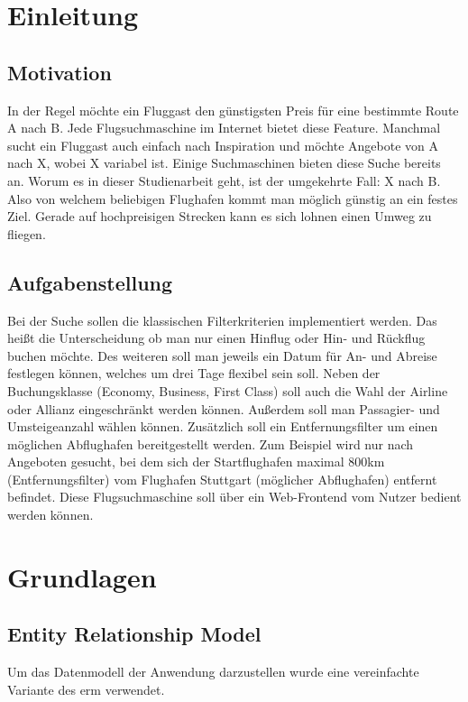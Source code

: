\documentclass[12pt,twoside,a4paper]{article}
\begin{document}
\section{Einleitung}
\subsection{Motivation}
In der Regel möchte ein Fluggast den günstigsten Preis für eine bestimmte Route A nach B. Jede Flugsuchmaschine im Internet bietet diese Feature. Manchmal sucht ein Fluggast auch einfach nach Inspiration und möchte Angebote von A nach X, wobei X variabel ist. Einige Suchmaschinen bieten diese Suche bereits an. Worum es in dieser Studienarbeit geht, ist der umgekehrte Fall: X nach B. Also von welchem beliebigen Flughafen kommt man möglich günstig an ein festes Ziel.\newline
Gerade auf hochpreisigen Strecken kann es sich lohnen einen Umweg zu fliegen.
\subsection{Aufgabenstellung}
Bei der Suche sollen die klassischen Filterkriterien implementiert werden. Das heißt die Unterscheidung ob man nur einen Hinflug oder Hin- und Rückflug buchen möchte. Des weiteren soll man jeweils ein Datum für An- und Abreise festlegen können, welches um drei Tage flexibel sein soll. Neben der Buchungsklasse (Economy, Business, First Class) soll auch die Wahl der Airline oder Allianz eingeschränkt werden können. Außerdem soll man Passagier- und Umsteigeanzahl wählen können.\newline
Zusätzlich soll ein Entfernungsfilter um einen möglichen Abflughafen bereitgestellt werden. Zum Beispiel wird nur nach Angeboten gesucht, bei dem sich der Startflughafen maximal 800km (Entfernungsfilter) vom Flughafen Stuttgart (möglicher Abflughafen) entfernt befindet.\newline
Diese Flugsuchmaschine soll über ein Web-Frontend vom Nutzer bedient werden können. \cite{example}
\section{Grundlagen}
\subsection{Entity Relationship Model}
Um das Datenmodell der Anwendung darzustellen wurde eine vereinfachte Variante des \acrfull{erm} verwendet.\\
\end{document}
